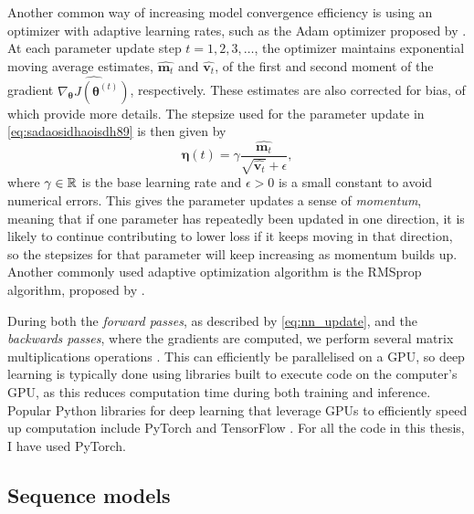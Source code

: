 \documentclass{statsmsc}
\begin{document}
{%
Another common way of increasing model convergence efficiency is using an optimizer with adaptive
learning rates, such as the Adam optimizer proposed by \cite{adam}.
At each parameter update step $t=1,2,3,\dots$, the optimizer maintains exponential moving average
estimates,
$\widehat{\mathbf{m}_t}$ and $\widehat{\mathbf{v}_t}$, of
the first and second moment of the gradient $\widehat{\nabla_{\bm\theta}
J\left(\bm\theta^{(t)}\right)}$, respectively. These estimates are also corrected for bias,
of which \cite{adam} provide more details.
The stepsize used for the parameter update in \cref{eq:sadaosidhaoisdh89} is then given by
\begin{equation}
    \bm\eta(t)=\gamma \frac{\widehat{\mathbf{m}_t}}{\sqrt{\widehat{\mathbf{v}_t}}+\epsilon},
\end{equation}
where $\gamma \in \mathbb{R}$ is the base learning rate and $\epsilon>0$ is a small constant to avoid
numerical errors.
This gives the parameter updates a sense of \textit{momentum}, meaning that if one parameter has
repeatedly been updated in one direction, it is likely to continue contributing to lower loss if
it keeps moving in that direction,
so the stepsizes for that parameter will keep increasing  as momentum builds up.
Another commonly used adaptive optimization algorithm is the RMSprop algorithm,
proposed by \cite{rmsprop}.

During both the \textit{forward passes}, as described by \cref{eq:nn_update}, and the
\textit{backwards passes}, where the gradients are computed, we perform
several matrix multiplications operations \citep{backprop}.
This can efficiently be parallelised on a \ac{GPU}, so deep learning is typically done using
libraries built to execute code on the computer's \ac{GPU}, as this reduces computation time
during both training and inference. Popular Python libraries for deep learning that leverage
\acp{GPU} to efficiently speed up computation include PyTorch \citep{pytorch} and TensorFlow \citep{tensorflow}. For all the code in this thesis, I have used PyTorch.

\subsection{Sequence models}%
\label{sub:Sequence models}

}
\end{document}
